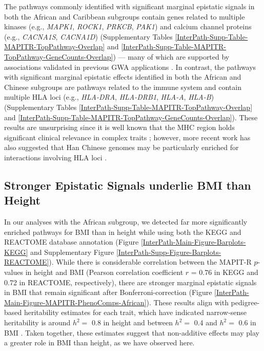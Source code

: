 \documentclass[10pt]{article}
\begin{document}
The pathways commonly identified with significant marginal epistatic signals in both the African and Caribbean subgroups contain genes related to multiple kinases (e.g., \textit{MAPK1}, \textit{ROCK1}, \textit{PRKCB}, \textit{PAK1}) and calcium channel proteins (e.g., \textit{CACNA1S}, \textit{CACNA1D}) (Supplementary Tables \ref{InterPath-Supp-Table-MAPITR-TopPathway-Overlap} and \ref{InterPath-Supp-Table-MAPITR-TopPathway-GeneCounts-Overlap}) --- many of which are supported by associations validated in previous GWA applications \cite{Cousminer2013,Wood2014a}. In contrast, the pathways with significant marginal epistatic effects identified in both the African and Chinese subgroups are pathways related to the immune system and contain multiple HLA loci (e.g., \textit{HLA-DRA}, \textit{HLA-DRB1}, \textit{HLA-A}, \textit{HLA-B}) (Supplementary Tables \ref{InterPath-Supp-Table-MAPITR-TopPathway-Overlap} and \ref{InterPath-Supp-Table-MAPITR-TopPathway-GeneCounts-Overlap}). These results are unsurprising since it is well known that the MHC region holds significant clinical relevance in complex traits \cite{Wan2010,Rose2012,Stahl2012,Crawford2018b}; however, more recent work has also suggested that Han Chinese genomes may be particularly enriched for interactions involving HLA loci \cite{Deng2020}. 

\subsection*{Stronger Epistatic Signals underlie BMI than Height}

In our analyses with the African subgroup, we detected far more significantly enriched pathways for BMI than in height while using both the KEGG and REACTOME database annotation (Figure \ref{InterPath-Main-Figure-Barplots-KEGG} and Supplementary Figure \ref{InterPath-Supp-Figure-Barplots-REACTOME}). While there is considerable correlation between the MAPIT-R $p$-values in height and BMI (Pearson correlation coefficient $r$ = 0.76 in KEGG and 0.72 in REACTOME, respectively), there are stronger marginal epistatic signals in BMI that remain significant after Bonferroni-correction (Figure \ref{InterPath-Main-Figure-MAPITR-PhenoComps-African}). These results align with pedigree-based heritability estimates for each trait, which have indicated narrow-sense heritability is around $h^2 =$ 0.8 in height and between $h^2 =$ 0.4 and $h^2 =$ 0.6 in BMI \cite{Elks2012,Visscher2012}. Taken together, these estimates suggest that non-additive effects may play a greater role in BMI than height, as we have observed here.
\end{document}
